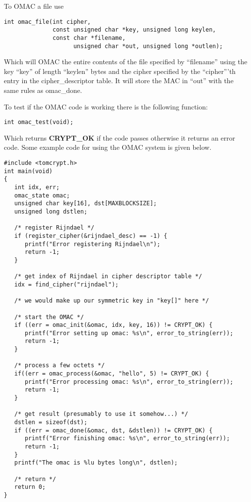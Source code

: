 \documentclass[a4paper]{book}
\begin{document}
To OMAC a file use
\begin{verbatim}
int omac_file(int cipher, 
              const unsigned char *key, unsigned long keylen,
              const char *filename, 
                    unsigned char *out, unsigned long *outlen);
\end{verbatim}

Which will OMAC the entire contents of the file specified by ``filename'' using the key ``key'' of length ``keylen'' bytes
and the cipher specified by the ``cipher'''th entry in the cipher\_descriptor table.  It will store the MAC in ``out'' with 
the same rules as omac\_done.

To test if the OMAC code is working there is the following function:
\begin{verbatim}
int omac_test(void);
\end{verbatim}
Which returns {\bf CRYPT\_OK} if the code passes otherwise it returns an error code.  Some example code for using the 
OMAC system is given below.

\begin{small}
\begin{verbatim}
#include <tomcrypt.h>
int main(void)
{
   int idx, err;
   omac_state omac;
   unsigned char key[16], dst[MAXBLOCKSIZE];
   unsigned long dstlen;

   /* register Rijndael */
   if (register_cipher(&rijndael_desc) == -1) {
      printf("Error registering Rijndael\n");
      return -1;
   }

   /* get index of Rijndael in cipher descriptor table */
   idx = find_cipher("rijndael");

   /* we would make up our symmetric key in "key[]" here */

   /* start the OMAC */
   if ((err = omac_init(&omac, idx, key, 16)) != CRYPT_OK) {
      printf("Error setting up omac: %s\n", error_to_string(err));
      return -1;
   }

   /* process a few octets */
   if((err = omac_process(&omac, "hello", 5) != CRYPT_OK) {
      printf("Error processing omac: %s\n", error_to_string(err));
      return -1;
   }

   /* get result (presumably to use it somehow...) */
   dstlen = sizeof(dst);
   if ((err = omac_done(&omac, dst, &dstlen)) != CRYPT_OK) {
      printf("Error finishing omac: %s\n", error_to_string(err));
      return -1;
   }
   printf("The omac is %lu bytes long\n", dstlen);
  
   /* return */
   return 0;
}
\end{verbatim}
\end{small}
\end{document}
